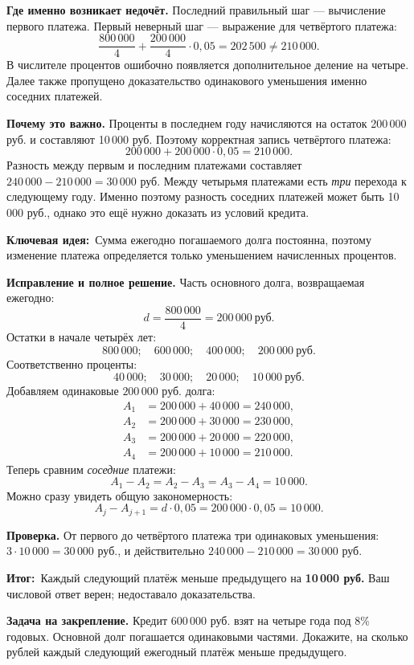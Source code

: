 \documentclass[a4paper,11pt]{article}
\newcommand{\idea}{\textcolor{deep}{\textbf{Ключевая идея:}}}
\newcommand{\result}{\textcolor{accent}{\textbf{Итог:}}}
\begin{document}
\textbf{Где именно возникает недочёт.} Последний правильный шаг --- вычисление первого платежа. Первый
неверный шаг --- выражение для четвёртого платежа:
\[
\frac{800\,000}{4}+\frac{200\,000}{4}\cdot0{,}05
=202\,500\ne210\,000.
\]
В числителе процентов ошибочно появляется дополнительное деление
на четыре. Далее также пропущено доказательство одинакового
уменьшения именно соседних платежей.

\textbf{Почему это важно.} Проценты в последнем году начисляются на остаток
200\,000 руб. и составляют 10\,000 руб. Поэтому корректная запись
четвёртого платежа:
\[
200\,000+200\,000\cdot0{,}05=210\,000.
\]
Разность между первым и последним платежами составляет \(240\,000-210\,000=30\,000\) руб.
Между четырьмя платежами есть \emph{три} перехода к следующему году.
Именно поэтому разность соседних платежей может быть 10\,000 руб.,
однако это ещё нужно доказать из условий кредита.

\idea\ Сумма ежегодно погашаемого долга постоянна, поэтому изменение
платежа определяется только уменьшением начисленных процентов.

\newpage
\textbf{Исправление и полное решение.}
Часть основного долга, возвращаемая ежегодно:
\[
d=\frac{800\,000}{4}=200\,000\ \text{руб.}
\]
Остатки в начале четырёх лет:
\[
800\,000;\quad600\,000;\quad400\,000;\quad200\,000\ \text{руб.}
\]
Соответственно проценты:
\[
40\,000;\quad30\,000;\quad20\,000;\quad10\,000\ \text{руб.}
\]
Добавляем одинаковые \(200\,000\) руб. долга:
\[
\begin{aligned}
A_1&=200\,000+40\,000=240\,000,\\
A_2&=200\,000+30\,000=230\,000,\\
A_3&=200\,000+20\,000=220\,000,\\
A_4&=200\,000+10\,000=210\,000.
\end{aligned}
\]
Теперь сравним \emph{соседние} платежи:
\[
A_1-A_2=A_2-A_3=A_3-A_4=10\,000.
\]
Можно сразу увидеть общую закономерность:
\[
A_j-A_{j+1}=d\cdot0{,}05
=200\,000\cdot0{,}05=10\,000.
\]

\textbf{Проверка.} От первого до четвёртого платежа три
одинаковых уменьшения:
\(3\cdot10\,000=30\,000\) руб., и действительно
\(240\,000-210\,000=30\,000\) руб.

\result\ Каждый следующий платёж меньше предыдущего на
\textbf{10\,000 руб.} Ваш числовой ответ верен; недоставало доказательства.

\textbf{Задача на закрепление.} Кредит 600\,000 руб. взят на четыре
года под 8\% годовых. Основной долг погашается одинаковыми частями.
Докажите, на сколько рублей каждый следующий ежегодный платёж
меньше предыдущего.
\end{document}
